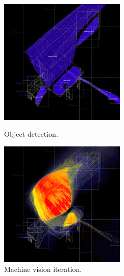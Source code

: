 \documentclass{article}
\newcommand\y{6}
\begin{document}
\begin{figure}[H]
  \captionsetup{font=small,justification=raggedright,singlelinecheck=false}
  \parbox{6cm}{
  \includegraphics[width=\y cm]{b.png}
  \caption{Object detection.}
  \label{fig:2figsA}}
  \qquad
  \begin{minipage}{6cm}
  \includegraphics[width=\y cm]{a.png}
  \caption{Machine vision iteration.}
  \label{fig:2figsB}
  \end{minipage}
\end{figure}
\end{document}
